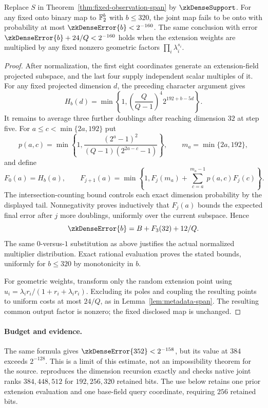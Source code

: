 \begin{theorem}\label{thm:dense-fixed-observation-span}
Replace $S$ in Theorem~\ref{thm:fixed-observation-span} by $\zkDenseSupport$. For any fixed onto binary map to $\mathbb{F}_2^b$ with $b\le320$, the joint map fails to be onto with probability at most $\zkDenseError{b}<2^{-160}$. The same conclusion with error $\zkDenseError{b}+24/Q<2^{-160}$ holds when the extension weights are multiplied by any fixed nonzero geometric factors $\prod_i\lambda_i^{s_i}$.
\end{theorem}
\begin{proof}
After normalization, the first eight coordinates generate an extension-field projected subspace, and the last four supply independent scalar multiples of it. For any fixed projected dimension $d$, the preceding character argument gives
\[
 H_b(d)=\min\left\{1,\left(\frac Q{Q-1}\right)^4 2^{192+b-5d}\right\}.
\]
It remains to average three further doublings after reaching dimension $32$ at step five. For $a\le c<\min\{2a,192\}$ put
\[
 p(a,c)=\min\left\{1,\frac{(2^a-1)^2}{(Q-1)(2^{2a-c}-1)}\right\},
 \qquad m_a=\min\{2a,192\},
\]
and define
\[
 F_0(a)=H_b(a),\qquad
 F_{j+1}(a)=\min\left\{1,F_j(m_a)+\sum_{c=a}^{m_a-1}p(a,c)F_j(c)\right\}.
\]
The intersection-counting bound controls each exact dimension probability by the displayed tail. Nonnegativity proves inductively that $F_j(a)$ bounds the expected final error after $j$ more doublings, uniformly over the current subspace. Hence
\[
 \zkDenseError{b}=B+F_3(32)+12/Q.
\]
The same $0$-versus-$1$ substitution as above justifies the actual normalized multiplier distribution. Exact rational evaluation proves the stated bounds, uniformly for $b\le320$ by monotonicity in $b$.

For geometric weights, transform only the random extension point using $u_i=\lambda_i r_i/(1+r_i+\lambda_i r_i)$. Excluding its poles and coupling the resulting points to uniform costs at most $24/Q$, as in Lemma~\ref{lem:metadata-span}. The resulting common output factor is nonzero; the fixed disclosed map is unchanged.
\end{proof}

\paragraph{Budget and evidence.} The same formula gives $\zkDenseError{352}<2^{-158}$, but its value at $384$ exceeds $2^{-128}$. This is a limit of this estimate, not an impossibility theorem for the source.  reproduces the dimension recursion exactly and checks native joint ranks $384,448,512$ for $192,256,320$ retained bits. The use below retains one prior extension evaluation and one base-field query coordinate, requiring $256$ retained bits.
